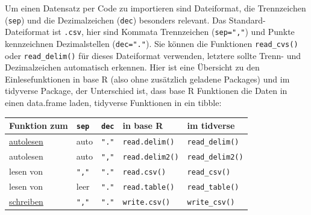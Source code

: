 \documentclass[
  ngerman,
]{book}
\begin{document}
Um einen Datensatz per Code zu importieren sind Dateiformat, die Trennzeichen (\texttt{sep}) und die Dezimalzeichen (\texttt{dec}) besonders relevant. Das Standard-Dateiformat ist \texttt{.csv}, hier sind Kommata Trennzeichen (\texttt{sep=","}) und Punkte kennzeichnen Dezimalstellen (\texttt{dec="."}). Sie können die Funktionen \texttt{read\_cvs()} oder \texttt{read\_delim()} für dieses Dateiformat verwenden, letztere sollte Trenn- und Dezimalzeichen automatisch erkennen. Hier ist eine Übersicht zu den Einlesefunktionen in base R (also ohne zusätzlich geladene Packages) und im tidyverse Package, der Unterschied ist, dass base R Funktionen die Daten in einen data.frame laden, tidyverse Funktionen in ein tibble:

\begin{longtable}[]{@{}
  >{\centering\arraybackslash}p{}
  >{\centering\arraybackslash}p{}
  >{\centering\arraybackslash}p{}
  >{\centering\arraybackslash}p{}
  >{\centering\arraybackslash}p{}@{}}
\toprule\noalign{}
\begin{minipage}[b]{\linewidth}\centering
Funktion zum
\end{minipage} & \begin{minipage}[b]{\linewidth}\centering
\texttt{sep}
\end{minipage} & \begin{minipage}[b]{\linewidth}\centering
\texttt{dec}
\end{minipage} & \begin{minipage}[b]{\linewidth}\centering
in base R
\end{minipage} & \begin{minipage}[b]{\linewidth}\centering
im tidverse
\end{minipage} \\
\midrule\noalign{}
\endhead
\bottomrule\noalign{}
\endlastfoot
\ul{autolesen} & auto & \texttt{"."} & \texttt{read.delim()} & \texttt{read\_delim()} \\
autolesen & auto & \texttt{","} & \texttt{read.delim2()} & \texttt{read\_delim2()} \\
lesen von & \texttt{","} & \texttt{"."} & \texttt{read.csv()} & \texttt{read\_csv()} \\
lesen von & leer & \texttt{"."} & \texttt{read.table()} & \texttt{read\_table()} \\
\ul{schreiben} & \texttt{","} & \texttt{"."} & \texttt{write.csv()} & \texttt{write\_csv()} \\
\end{longtable}
\end{document}
